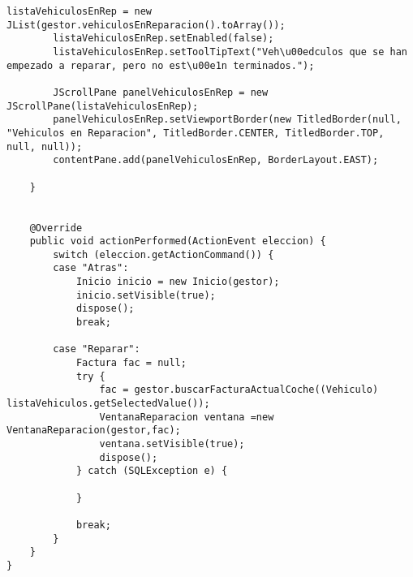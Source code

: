 \begin{lstlisting}[caption=ElegirVehiculoReparar.java (App Escritorio)]
		listaVehiculosEnRep = new JList(gestor.vehiculosEnReparacion().toArray());
		listaVehiculosEnRep.setEnabled(false);
		listaVehiculosEnRep.setToolTipText("Veh\u00edculos que se han empezado a reparar, pero no est\u00e1n terminados.");
		
		JScrollPane panelVehiculosEnRep = new JScrollPane(listaVehiculosEnRep);
		panelVehiculosEnRep.setViewportBorder(new TitledBorder(null, "Vehiculos en Reparacion", TitledBorder.CENTER, TitledBorder.TOP, null, null));
		contentPane.add(panelVehiculosEnRep, BorderLayout.EAST);
			
	}
	
	
	@Override
	public void actionPerformed(ActionEvent eleccion) {
		switch (eleccion.getActionCommand()) {
		case "Atras":
			Inicio inicio = new Inicio(gestor);
			inicio.setVisible(true);
			dispose();
			break;
			
		case "Reparar":
			Factura fac = null;
			try {
				fac = gestor.buscarFacturaActualCoche((Vehiculo) listaVehiculos.getSelectedValue());
				VentanaReparacion ventana =new VentanaReparacion(gestor,fac);
				ventana.setVisible(true);
				dispose();
			} catch (SQLException e) {
				
			}
			
			break;
		}
	}
}
\end{lstlisting}
\clearpage

